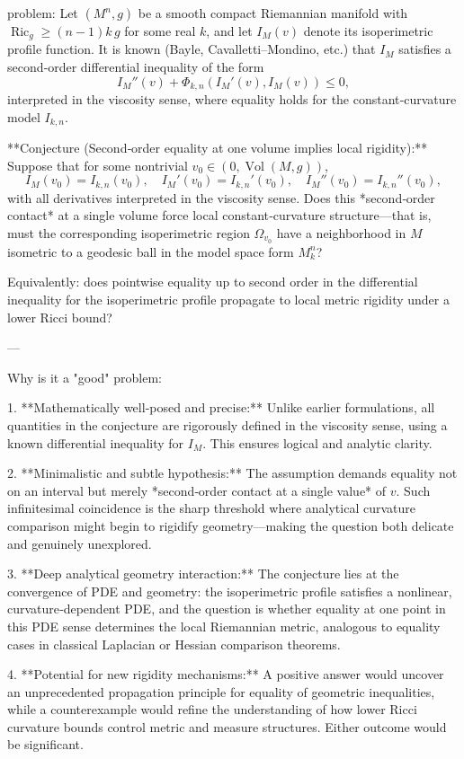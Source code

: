 problem:  
Let \((M^n,g)\) be a smooth compact Riemannian manifold with \(\operatorname{Ric}_g \ge (n-1)k\, g\) for some real \(k\), and let \(I_M(v)\) denote its isoperimetric profile function.  
It is known (Bayle, Cavalletti–Mondino, etc.) that \(I_M\) satisfies a second‑order differential inequality of the form  
\[
I_M''(v) + \Phi_{k,n}(I_M'(v), I_M(v)) \le 0,
\]
interpreted in the viscosity sense, where equality holds for the constant‑curvature model \(I_{k,n}\).

**Conjecture (Second‑order equality at one volume implies local rigidity):**  
Suppose that for some nontrivial \(v_0\in(0,\operatorname{Vol}(M,g))\),
\[
I_M(v_0)=I_{k,n}(v_0), \quad I_M'(v_0)=I_{k,n}'(v_0), \quad 
I_M''(v_0)=I_{k,n}''(v_0),
\]
with all derivatives interpreted in the viscosity sense.  
Does this *second‑order contact* at a single volume force local constant‑curvature structure—that is, must the corresponding isoperimetric region \(\Omega_{v_0}\) have a neighborhood in \(M\) isometric to a geodesic ball in the model space form \(M_k^n\)?  

Equivalently: does pointwise equality up to second order in the differential inequality for the isoperimetric profile propagate to local metric rigidity under a lower Ricci bound?

---

Why is it a "good" problem:  

1. **Mathematically well‑posed and precise:**  
   Unlike earlier formulations, all quantities in the conjecture are rigorously defined in the viscosity sense, using a known differential inequality for \(I_M\). This ensures logical and analytic clarity.

2. **Minimalistic and subtle hypothesis:**  
   The assumption demands equality not on an interval but merely *second‑order contact at a single value* of \(v\). Such infinitesimal coincidence is the sharp threshold where analytical curvature comparison might begin to rigidify geometry—making the question both delicate and genuinely unexplored.

3. **Deep analytical geometry interaction:**  
   The conjecture lies at the convergence of PDE and geometry: the isoperimetric profile satisfies a nonlinear, curvature‑dependent PDE, and the question is whether equality at one point in this PDE sense determines the local Riemannian metric, analogous to equality cases in classical Laplacian or Hessian comparison theorems.

4. **Potential for new rigidity mechanisms:**  
   A positive answer would uncover an unprecedented propagation principle for equality of geometric inequalities, while a counterexample would refine the understanding of how lower Ricci curvature bounds control metric and measure structures. Either outcome would be significant.

